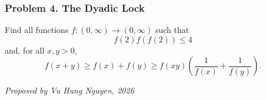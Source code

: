 \subsubsection*{Problem 4. The Dyadic Lock}

\begin{exercisebox}[medium]

Find all functions $f:(0,\infty)\to(0,\infty)$ such that
\[
f(2)f(f(2))\leq4
\]
and, for all $x,y>0$,
\[
f(x+y)\geq f(x)+f(y)
\geq f(xy)\left(\frac1{f(x)}+\frac1{f(y)}\right).
\]

\begin{flushright}
\textit{Proposed by Vu Hung Nguyen, 2026}
\end{flushright}


\end{exercisebox}